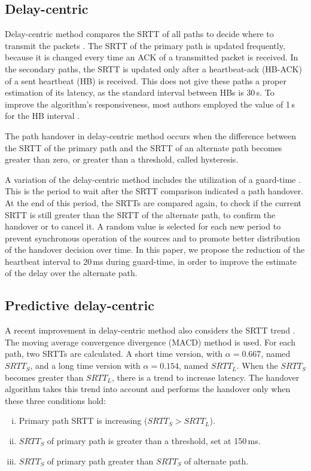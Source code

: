 \documentclass{sbrt2015}
\begin{document}
\subsection{Delay-centric}

Delay-centric method compares the SRTT of all paths to decide where to transmit the packets \cite{Kelly2004}. The SRTT of the primary path is updated frequently, because it is changed every time an ACK of a transmitted packet is received. In the secondary paths, the SRTT is updated only after a heartbeat-ack (HB-ACK) of a sent heartbeat (HB) is received. This does not give these paths a proper estimation of its latency, as the standard interval between HBs is 30\,s. To improve the algorithm's responsiveness, most authors employed the value of 1\,s for the HB interval \cite{Noonan2004b}\cite{Gavriloff2009}\cite{Torres2014}.

The path handover in delay-centric method occurs when the difference between the SRTT of the primary path and the SRTT of an alternate path becomes greater than zero, or greater than a threshold, called hysteresis.

A variation of the delay-centric method includes the utilization of a guard-time \cite{Leung2012}. This is the period to wait after the SRTT comparison indicated a path handover. At the end of this period, the SRTTs are compared again, to check if the current SRTT is still greater than the SRTT of the alternate path, to confirm the handover or to cancel it. A random value is selected for each new period to prevent synchronous operation of the sources and to promote better distribution of the handover decision over time. In this paper, we propose the reduction of the heartbeat interval to 20\,ms during guard-time, in order to improve the estimate of the delay over the alternate path.

\subsection{Predictive delay-centric}

 A recent improvement in delay-centric method also considers the SRTT trend \cite{Torres2014}. The moving average convergence divergence (MACD) method is used. For each path, two SRTTs are calculated. A short time version, with $\alpha = 0.667$, named $SRTT_S$, and a long time version with $\alpha = 0.154$, named $SRTT_L$. When the $SRTT_S$ becomes greater than $SRTT_L$, there is a trend to increase latency. The handover algorithm takes this trend into account and performs the handover only when these three conditions hold:
\begin{enumerate}[i)]
 \item Primary path SRTT is increasing ($SRTT_S > SRTT_L$).
 \item $SRTT_S$ of primary path is greater than a threshold, set at 150\,ms.
 \item $SRTT_S$ of primary path greater than $SRTT_S$ of alternate path.
\end{enumerate}
\end{document}
